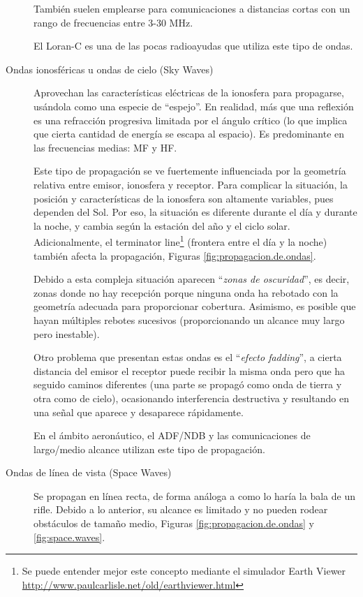 \begin{description}
Tambi\'en suelen emplearse para comunicaciones a distancias cortas con un rango de frecuencias entre 3-30 MHz.

El Loran-C es una de las pocas radioayudas que utiliza este tipo de ondas. 


\item[Ondas ionosf\'ericas  u ondas de cielo (Sky Waves)] Aprovechan las caracter\'isticas el\'ectricas de la ionosfera para propagarse, us\'andola como una especie de ``espejo''. En realidad, m\'as que una reflexi\'on es una refracci\'on progresiva limitada por el \'angulo cr\'itico (lo que implica que cierta cantidad de energ\'ia se escapa al espacio). Es predominante en las frecuencias medias: MF y HF.

Este tipo de propagaci\'on se ve fuertemente influenciada por la geometr\'ia relativa entre emisor, ionosfera y receptor. Para complicar la situaci\'on, la posici\'on y caracter\'isticas de la ionosfera son altamente variables, pues dependen del Sol. Por eso, la situaci\'on es diferente durante el d\'ia y durante la noche, y cambia seg\'un la estaci\'on del a\~no y el ciclo solar. Adicionalmente, el terminator line\footnote{Se puede entender mejor este concepto mediante el simulador Earth Viewer \url{http://www.paulcarlisle.net/old/earthviewer.html} } (frontera entre el d\'ia y la noche) tambi\'en afecta la propagaci\'on,  Figuras \ref{fig:propagacion.de.ondas}.

Debido a esta compleja situaci\'on aparecen ``\emph{zonas de oscuridad}'', es decir, zonas donde no hay recepci\'on porque ninguna onda ha rebotado con la geometr\'ia adecuada para proporcionar cobertura. Asimismo, es posible que hayan m\'ultiples rebotes sucesivos (proporcionando un alcance muy largo pero inestable).

Otro problema que presentan estas ondas es el ``\emph{efecto fadding}'', a cierta distancia del emisor el receptor puede recibir la misma onda pero que ha seguido caminos diferentes (una parte se propag\'o como onda de tierra y otra como de cielo), ocasionando interferencia destructiva y resultando en una se\~nal que aparece y desaparece r\'apidamente.

En el \'ambito aeron\'autico, el ADF/NDB y las comunicaciones de largo/medio alcance utilizan este tipo de propagaci\'on. 


\item[Ondas de l\'inea de vista (Space Waves)] Se propagan en l\'inea recta, de forma an\'aloga a como lo har\'ia la bala de un rifle. Debido a lo anterior, su alcance es limitado y no pueden rodear obst\'aculos de tama\~no medio, Figuras \ref{fig:propagacion.de.ondas} y \ref{fig:space.waves}.


\end{description}
